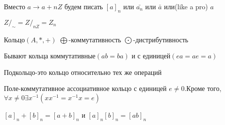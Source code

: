 \documentclass[12pt]{article}
\begin{document}
		Вместо $a\rightarrow a+nZ$ будем писать $[a]_n$ или $ \bar{a_n}$ или $\bar{a}$ или(like a pro) $a$
		
		$Z/_{\sim}=Z/_{nZ}=Z_n$
		
		Кольцо$(A,*,+)$
		$\bigoplus$-коммутативность
		$\bigodot$-дистрибутивность
		
		Бывают кольца коммутативные$(ab=ba)$ и с единицей$(ea=ae=a)$
		
		Подкольцо-это кольцо относительно тех же операций
		
		Поле-коммутативное ассоциативное кольцо с единицей $e\not= 0$.Кроме того, $\forall x\not=0 \exists x^{-1} (xx^{-1}=x^{-1}x=e)$
		
		$[a]_n+[b]_n=[a+b]_n$ и $[a]_n [b]_n=[ab]_n$
		
		
			
			
			
		
		
		

		
		
		
	
\end{document}
